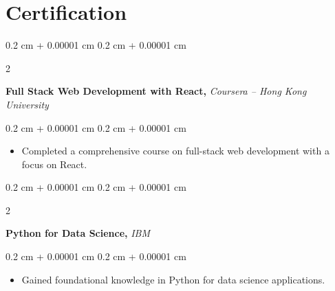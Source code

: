 \documentclass[10pt, letterpaper]{article}
\newenvironment{highlightsforbulletentries}{
        \begin{itemize}[
            topsep=0.10 cm,
            parsep=0.10 cm,
            partopsep=0pt,
            itemsep=0pt,
            leftmargin=10pt
        ]
    }{
        \end{itemize}
    }
\newenvironment{onecolentry}{
        \begin{adjustwidth}{
            0.2 cm + 0.00001 cm
        }{
            0.2 cm + 0.00001 cm
        }
    }{
        \end{adjustwidth}
    }
\newenvironment{twocolentry}[2][]{
        \onecolentry
        \def\secondColumn{#2}
        \setcolumnwidth{\fill, 4.5 cm}
        \begin{paracol}{2}
    }{
        \switchcolumn \raggedleft \secondColumn
        \end{paracol}
        \endonecolentry
    }
\begin{document}
        \section{Certification}
            \begin{samepage}
                \begin{twocolentry}{
                    2020
                }
                \textbf{Full Stack Web Development with React,}        
                \textit{Coursera – Hong Kong University}
                \end{twocolentry}
                \vspace{0.10 cm}
                \begin{onecolentry}
                    \begin{highlightsforbulletentries}
                            \item Completed a comprehensive course on full-stack web development with a focus on React.
                            \vspace{-2pt}
                    \end{highlightsforbulletentries}
                \end{onecolentry}
            \end{samepage}
            \vspace{0.2 cm}
            \begin{samepage}
                \begin{twocolentry}{
                    2019
                }
                \textbf{Python for Data Science,}        
                \textit{IBM}
                \end{twocolentry}
                \vspace{0.10 cm}
                \begin{onecolentry}
                    \begin{highlightsforbulletentries}
                            \item Gained foundational knowledge in Python for data science applications.
                            \vspace{-2pt}
                    \end{highlightsforbulletentries}
                \end{onecolentry}
            \end{samepage}
            \vspace{0.2 cm}
\end{document}
